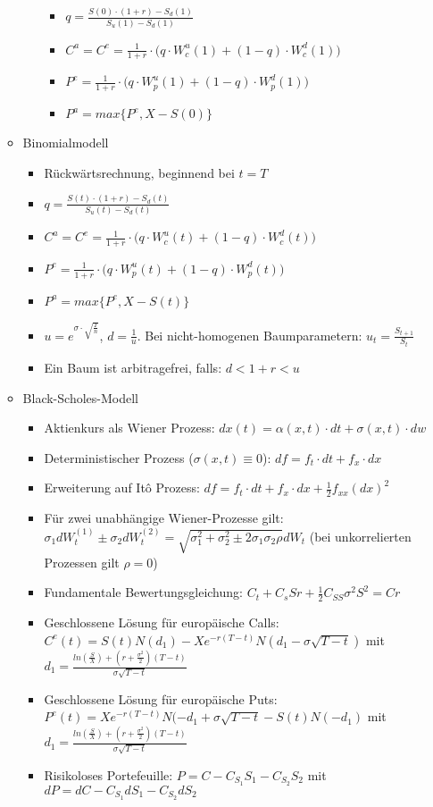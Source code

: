 \begin{itemize}
\begin{itemize}
\begin{enumerate}
			\begin{itemize}
				\item \(q=\frac{S(0)\cdot(1+r)-S_d(1)}{S_u(1)-S_d(1)}\)
				\item \(C^a=C^e=\frac{1}{1+r}\cdot\Big(q\cdot W_c^u(1)+(1-q)\cdot W_c^d(1)\Big)\)
				\item \(P^e=\frac{1}{1+r}\cdot\Big(q\cdot W_p^u(1)+(1-q)\cdot W_p^d(1)\Big)\)
				\item \(P^a=max\Big\{P^e,X-S(0)\Big\}\)
			\end{itemize}
		\end{enumerate}
		\item Binomialmodell
		\begin{itemize}
			\item Rückwärtsrechnung, beginnend bei \(t=T\)
			\item \(q=\frac{S(t)\cdot(1+r)-S_d(t)}{S_u(t)-S_d(t)}\)
			\item \(C^a=C^e=\frac{1}{1+r}\cdot\Big(q\cdot W_c^u(t)+(1-q)\cdot W_c^d(t)\Big)\)
			\item \(P^e=\frac{1}{1+r}\cdot\Big(q\cdot W_p^u(t)+(1-q)\cdot W_p^d(t)\Big)\)
			\item \(P^a=max\Big\{P^e,X-S(t)\Big\}\)
			\item \(u=e^{\sigma\cdot\sqrt{\frac{T}{n}}}\), \(d=\frac{1}{u}\). Bei nicht-homogenen Baumparametern: \(u_t=\frac{S_{t+1}}{S_t}\)
			\item Ein Baum ist arbitragefrei, falls: \(d<1+r<u\)
		\end{itemize}
		\item Black-Scholes-Modell
		\begin{itemize}
			\item Aktienkurs als Wiener Prozess: \(dx(t) = \alpha(x,t)\cdot dt + \sigma(x,t)\cdot dw\)
			\item Deterministischer Prozess (\(\sigma(x,t) \equiv 0\)): \(df=f_t\cdot dt + f_x\cdot dx\)
			\item Erweiterung auf Itô Prozess: \(df=f_t\cdot dt + f_x\cdot dx + \frac{1}{2} f_{xx}(dx)^2\)
			\item Für zwei unabhängige Wiener-Prozesse gilt: \(\sigma_1dW_t^{(1)} \pm \sigma_2dW_t^{(2)} = \sqrt{\sigma_1^2+\sigma_2^2 \pm 2\sigma_1\sigma_2\rho}dW_t\) (bei unkorrelierten Prozessen gilt \(\rho=0\))
			\item Fundamentale Bewertungsgleichung: \(C_t + C_sSr + \frac{1}{2}C_{SS}\sigma^2S^2 = Cr\)
			\item Geschlossene Lösung für europäische Calls: \(C^e(t) = S(t)N(d_1) - Xe^{-r(T-t)}N(d_1-\sigma\sqrt{T-t})\) mit \(d_1 = \frac{ln(\frac{S}{X})+(r+\frac{\sigma^2}{2})(T-t)}{\sigma\sqrt{T-t}}\)
			\item Geschlossene Lösung für europäische Puts: \(P^e(t) = Xe^{-r(T-t)}N(-d_1+\sigma\sqrt{T-t}-S(t)N(-d_1)\) mit \(d_1 = \frac{ln(\frac{S}{X})+(r+\frac{\sigma^2}{2})(T-t)}{\sigma\sqrt{T-t}}\)
			\item Risikoloses Portefeuille: \(P=C-C_{S_1}S_1-C_{S_2}S_2\) mit \(dP=dC-C_{S_1}dS_1-C_{S_2}dS_2\)
		\end{itemize}
	\end{itemize}
\end{itemize}



